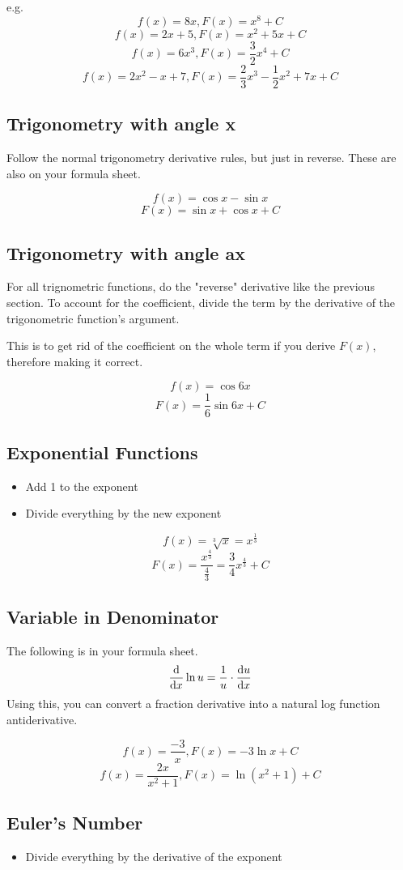\documentclass[a4paper,12pt]{article}
\begin{document}
e.g.
$$f(x) = 8x, F(x) = x^8 + C$$
$$f(x) = 2x + 5, F(x) = x^2 + 5x + C$$
$$f(x) = 6x^3, F(x) = \frac{3}{2}x^4 + C$$
$$f(x) = 2x^2 - x + 7, F(x) = \frac{2}{3}x^3 - \frac{1}{2}x^2 + 7x + C$$

\subsection{Trigonometry with angle x}
Follow the normal trigonometry derivative rules, but just in reverse. These are also on your formula sheet.

$$f(x) = \cos{x} - \sin{x}$$
$$F(x) = \sin{x} + \cos{x} + C$$

\subsection{Trigonometry with angle ax}
For all trignometric functions, do the "reverse" derivative like the previous section.
To account for the coefficient, divide the term by the derivative of the trigonometric function's argument.

This is to get rid of the coefficient on the whole term if you derive $F(x)$, therefore making it correct.

$$f(x) = \cos{6x}$$
$$F(x) = \frac{1}{6}\sin{6x} + C$$

\subsection{Exponential Functions}
\begin{itemize}
    \item{Add 1 to the exponent}
    \item{Divide everything by the new exponent}
\end{itemize}

$$f(x) = \sqrt[3]{x} = x^{\frac{1}{3}}$$
$$F(x) = \frac{x^{\frac{4}{3}}}{\frac{4}{3}} = \frac{3}{4}x^{\frac{4}{3}} + C$$

\subsection{Variable in Denominator}
The following is in your formula sheet.
$$\dv{}{x}\ln{u} = \frac{1}{u} \cdot \dv{u}{x}$$
Using this, you can convert a fraction derivative into a natural log function antiderivative.

$$f(x) = \frac{-3}{x}, F(x) = -3\ln{x} + C$$
$$f(x) = \frac{2x}{x^2 + 1}, F(x) = \ln{(x^2 + 1)} + C$$

\subsection{Euler's Number}
\begin{itemize}
    \item{Divide everything by the derivative of the exponent}
\end{itemize}
\end{document}
